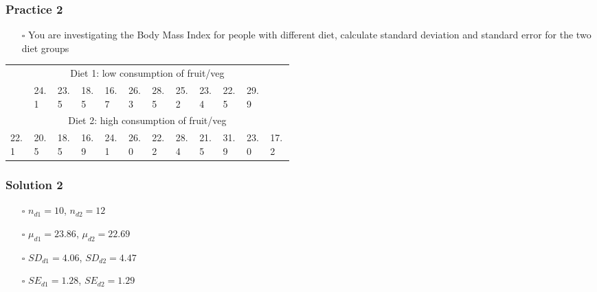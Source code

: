 \documentclass[handout]{beamer}
\begin{document}
\begin{frame}
    \frametitle{Practice 2}
    \begin{itemize}[wide = 0pt]
        \item[$\square$] You are investigating the Body Mass Index for people with different diet, calculate standard deviation and standard error for the two diet groups
    \end{itemize}
    \vspace{15pt}
    \centering
    \begin{tabular}{p{0.04\linewidth} p{0.04\linewidth} p{0.04\linewidth} p{0.04\linewidth} p{0.04\linewidth} p{0.04\linewidth} p{0.04\linewidth} p{0.04\linewidth} p{0.04\linewidth} p{0.04\linewidth} p{0.04\linewidth} p{0.04\linewidth}}
    \toprule
        \multicolumn{12}{c}{Diet 1: low consumption of fruit/veg}  \\
        & \small{24.1} & \small{23.5} & \small{18.5} & \small{16.7} & \small{26.3} & \small{28.5} & \small{25.2} & \small{23.4} & \small{22.5} & \small{29.9} & \\
        \midrule
        \multicolumn{12}{c}{Diet 2: high consumption of fruit/veg} \\
        \small{22.1} & \small{20.5} & \small{18.5} & \small{16.9} & \small{24.1} & \small{26.0} & \small{22.2} & \small{28.4} & \small{21.5} & \small{31.9} & \small{23.0} & \small{17.2} \\
        \bottomrule
    \end{tabular}
    \vspace*{\fill}
\end{frame}

\begin{frame}
    \frametitle{Solution 2}
    \begin{itemize}[wide = 0pt]
        \item[$\square$] $n_{d1} = 10$, $n_{d2} = 12$ 
        \vspace{5pt}
        \item[$\square$] $\mu_{d1}=23.86$, $\mu_{d2}=22.69$
        \vspace{5pt}
        \item[$\square$] $SD_{d1} = 4.06$, $SD_{d2} = 4.47$
        \vspace{5pt}
        \item[$\square$] $SE_{d1} = 1.28$, $SE_{d2} = 1.29$
    \end{itemize} 
    
\end{frame}
\end{document}
